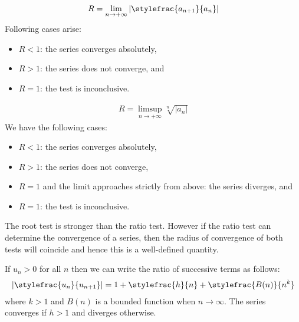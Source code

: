     \begin{method}
        \begin{gather}
            R = \lim_{n\rightarrow+\infty}\left|\stylefrac{a_{n+1}}{a_n}\right|
        \end{gather}
        Following cases arise:
        \begin{itemize}
            \item $R < 1$: the series converges absolutely,
            \item $R > 1$: the series does not converge, and
            \item $R = 1$: the test is inconclusive.
        \end{itemize}
    \end{method}

    \begin{method}
        \begin{gather}
            R = \limsup_{n\rightarrow+\infty}\sqrt[n]{|a_n|}
        \end{gather}
        We have the following cases:
        \begin{itemize}
            \item $R < 1$: the series converges absolutely,
            \item $R > 1$: the series does not converge,
            \item $R = 1$ and the limit approaches strictly from above: the series diverges, and
            \item $R = 1$: the test is inconclusive.
        \end{itemize}
    \end{method}
    \begin{remark}
        The root test is stronger than the ratio test. However if the ratio test can determine the convergence of a series, then the radius of convergence of both tests will coincide and hence this is a well-defined quantity.
    \end{remark}

    \begin{method}
        If $u_n>0$ for all $n$ then we can write the ratio of successive terms as follows:
        \begin{gather}
            \label{series:gauss_test}
            \left|\stylefrac{u_n}{u_{n+1}}\right| = 1 + \stylefrac{h}{n} + \stylefrac{B(n)}{n^k}
        \end{gather}
        where $k > 1$ and $B(n)$ is a bounded function when $n\rightarrow\infty$. The series converges if $h > 1$ and diverges otherwise.
    \end{method}

